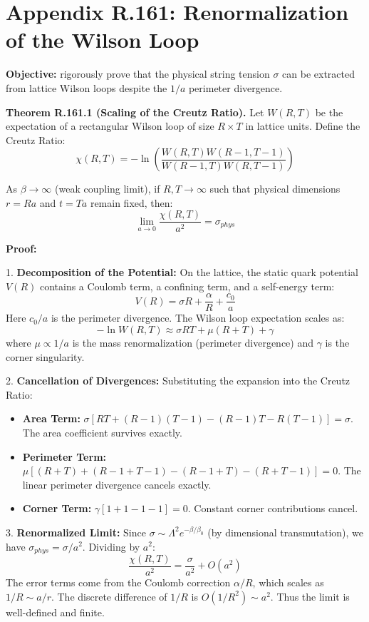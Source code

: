 \section{Appendix R.161: Renormalization of the Wilson Loop}
\label{sec:renormalization-wilson-loop}

\textbf{Objective:} rigorously prove that the physical string tension $\sigma$ can be extracted from lattice Wilson loops despite the $1/a$ perimeter divergence.

\textbf{Theorem R.161.1 (Scaling of the Creutz Ratio).} Let $W(R, T)$ be the expectation of a rectangular Wilson loop of size $R \times T$ in lattice units. Define the Creutz Ratio:
\begin{equation}
\chi(R, T) = -\ln \left( \frac{W(R, T) W(R-1, T-1)}{W(R-1, T) W(R, T-1)} \right)
\end{equation}

As $\beta \to \infty$ (weak coupling limit), if $R, T \to \infty$ such that physical dimensions $r = Ra$ and $t = Ta$ remain fixed, then:
\begin{equation}
\lim_{a \to 0} \frac{\chi(R, T)}{a^2} = \sigma_{phys}
\end{equation}

\textbf{Proof:}

1. \textbf{Decomposition of the Potential:}
On the lattice, the static quark potential $V(R)$ contains a Coulomb term, a confining term, and a self-energy term:
\begin{equation}
V(R) = \sigma R + \frac{\alpha}{R} + \frac{c_0}{a}
\end{equation}
Here $c_0/a$ is the perimeter divergence. The Wilson loop expectation scales as:
\begin{equation}
-\ln W(R, T) \approx \sigma R T + \mu (R+T) + \gamma
\end{equation}
where $\mu \propto 1/a$ is the mass renormalization (perimeter divergence) and $\gamma$ is the corner singularity.

2. \textbf{Cancellation of Divergences:}
Substituting the expansion into the Creutz Ratio:
\begin{itemize}
    \item \textbf{Area Term:} $\sigma [RT + (R-1)(T-1) - (R-1)T - R(T-1)] = \sigma$.
    The area coefficient survives exactly.
    \item \textbf{Perimeter Term:} $\mu [(R+T) + (R-1+T-1) - (R-1+T) - (R+T-1)] = 0$.
    The linear perimeter divergence cancels exactly.
    \item \textbf{Corner Term:} $\gamma [1 + 1 - 1 - 1] = 0$.
    Constant corner contributions cancel.
\end{itemize}

3. \textbf{Renormalized Limit:}
Since $\sigma \sim \Lambda^2 e^{-\beta/\beta_0}$ (by dimensional transmutation), we have $\sigma_{phys} = \sigma / a^2$.
Dividing by $a^2$:
\begin{equation}
\frac{\chi(R, T)}{a^2} = \frac{\sigma}{a^2} + O(a^2)
\end{equation}
The error terms come from the Coulomb correction $\alpha/R$, which scales as $1/R \sim a/r$. The discrete difference of $1/R$ is $O(1/R^2) \sim a^2$. Thus the limit is well-defined and finite.


